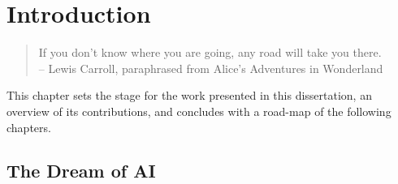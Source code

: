 \chapter{Introduction}

\begin{quote}
If you don't know where you are going, any road will take you there.\\
  -- Lewis Carroll, paraphrased from Alice's Adventures in Wonderland
\end{quote}


This chapter sets the stage for the work presented in this dissertation, an overview of its contributions, and concludes with a road-map of the following chapters.


\section{The Dream of AI}

